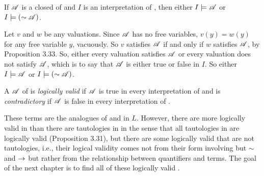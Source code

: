 \begin{corollary}
  If \(\mathscr{A}\) is a closed \wf{} of \cl{} and \(I\) is an interpretation of \cl{}, then either \(I \models \mathscr{A}\) or \(I \models (\sim \mathscr{A})\).

  \prf{} Let \(v\) and \(w\) be any valuations. Since \(\mathscr{A}\) has no free variables, \(v(y) = w(y)\) for any free variable \(y\), vacuously. So \(v\) satisfies \(\mathscr{A}\) if and only if \(w\) satisfies \(\mathscr{A}\), by Proposition 3.33. So, either every valuation satisfies \(\mathscr{A}\) or every valuation does not satisfy \(\mathscr{A}\), which is to say that \(\mathscr{A}\) is either true or false in \(I\). So either \(I \models \mathscr{A}\) or \(I \models (\sim\mathscr{A})\).
\end{corollary}

\begin{definition}
  A \wf{} \(\mathscr{A}\) of \cl{} is \textit{logically valid} if \(\mathscr{A}\) is true in every interpretation of \cl{} and is \textit{contradictory} if \(\mathscr{A}\) is false in every interpretation of \cl{}.
\end{definition}

These terms are the analogues of  and  in \(L\). However, there are more logically valid \wfs{} in \cl{} than there are tautologies in \cl{} in the sense that all tautologies in \cl{} are logically valid (Proposition 3.31), but there are some logically valid \wfs{} that are not tautologies, i.e., their logical validity comes not from their form involving but \(\sim\) and \(\rightarrow\) but rather from the relationship between quantifiers and terms. The goal of the next chapter is to find all of these logically valid \wfs{}.

\solutions{}

